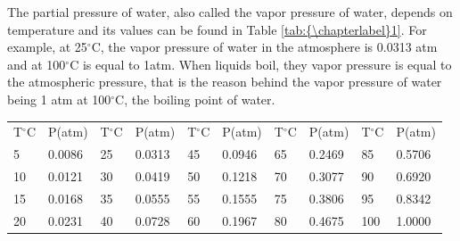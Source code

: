 \documentclass[main.tex]{subfiles}
\begin{document}
\begin{description}
The partial pressure of water, also called the vapor pressure of water, depends on temperature and its values can be found in Table \ref{tab:{\chapterlabel}1}. For example, at 25$^{\circ}$C, the vapor pressure of water in the atmosphere is 0.0313 atm and at 100$^{\circ}$C is equal to 1atm. When liquids boil, they vapor pressure is equal to the atmospheric pressure, that is the reason behind the vapor pressure of water being 1 atm at 100$^{\circ}$C, the boiling point of water.



\begin{center}
 \label{tab:{\chapterlabel}1}
\selectfont
\begin{tabular}{llllllllll}
\rowcolor{black!45}
\toprule
\multicolumn{10}{l}{\hypersetup{colorlinks,linkcolor={white}} \cellcolor{black}\color{white}\bfseries\small Table \ref{tab:{\chapterlabel}1} Vapor pressure, partial water pressure as a function of temperature } \\
\midrule
 \rowcolor{gray!10} T$^{\circ}$C & P(atm) & T$^{\circ}$C & P(atm) & T$^{\circ}$C &  P(atm) & T$^{\circ}$C &  P(atm)& T$^{\circ}$C &  P(atm)\\
\midrule
  5	 & 	0.0086&	 25	  &	0.0313&	45	  &	0.0946&	65	  &	0.2469&	85	 & 	0.5706	\\
10	  &	0.0121&	30	  &	0.0419&	50	 & 	0.1218&	70	 & 	0.3077&	90	  &	0.6920	\\
15	  &	0.0168&	35	  &	0.0555&	55	  &	0.1555&	75	 & 	0.3806&	95	 & 	0.8342	\\
20	  &	0.0231&	40	  &	0.0728&	60	  &	0.1967&	80	 & 	0.4675&	100	  &	1.0000	\\
 \bottomrule
\end{tabular}\end{center}


\end{description}
\end{document}
